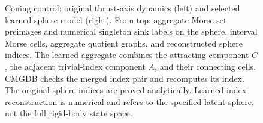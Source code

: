 \begin{figure}[tbp]
\centering
{}
\caption{Coning control: original thrust-axis dynamics (left) and selected learned sphere model (right). From top: aggregate Morse-set preimages and numerical singleton sink labels on the sphere, interval Morse cells, aggregate quotient graphs, and reconstructed sphere indices. The learned aggregate combines the attracting component $C$, the adjacent trivial-index component $A$, and their connecting cells. CMGDB checks the merged index pair and recomputes its index. The original sphere indices are proved analytically. Learned index reconstruction is numerical and refers to the specified latent sphere, not the full rigid-body state space.}
\label{fig:attitude-computation}
\end{figure}
